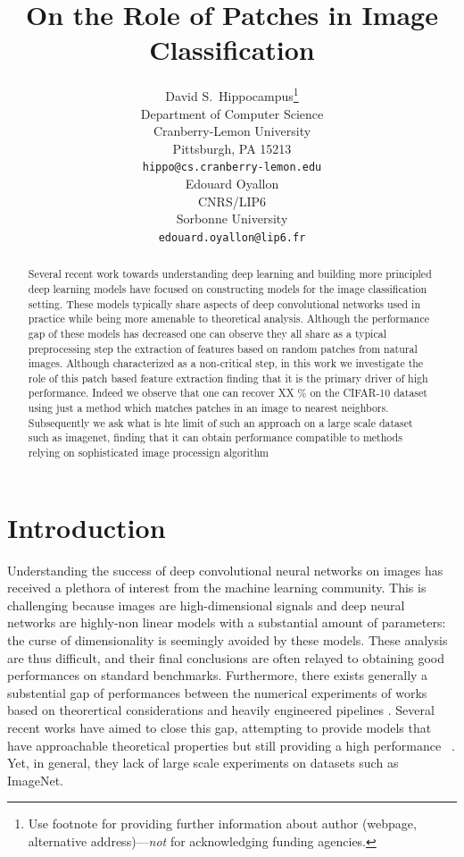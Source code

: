 \documentclass{article}
\title{On the Role of Patches in \Edouard{ Analysis of}  Image Classification \Edouard{models}}
\author{%
  David S.~Hippocampus\thanks{Use footnote for providing further information
    about author (webpage, alternative address)---\emph{not} for acknowledging
    funding agencies.} \\
  Department of Computer Science\\
  Cranberry-Lemon University\\
  Pittsburgh, PA 15213 \\
  \texttt{hippo@cs.cranberry-lemon.edu} \\
  \And
  Edouard Oyallon \\
  CNRS/LIP6 \\
  Sorbonne University \\
  \texttt{edouard.oyallon@lip6.fr} \\
}
\begin{document}
\maketitle

\begin{abstract}
  Several recent work towards understanding deep learning and building more principled deep learning models have focused on constructing models for the image classification setting. These models typically share aspects of deep convolutional networks used in practice while being more amenable to theoretical analysis. Although the performance gap of these models has decreased one can observe they all share as a typical preprocessing step the extraction of features based on random patches from natural images. Although characterized as a non-critical step, in this work we investigate the role of this patch based feature extraction finding that it is the primary driver of high performance. Indeed we observe that one can recover XX \% on the CIFAR-10 dataset using just a method which matches patches in an image to nearest neighbors. Subsequently we ask what is hte limit of such an approach on a large scale dataset such as imagenet, finding that it can obtain performance compatible to methods relying on sophisticated image processign algorithm
 
\end{abstract}

\section{Introduction}
Understanding the success of deep convolutional neural networks on images has received a plethora of interest from the machine learning community. 
This is challenging because images are high-dimensional signals and deep neural networks are highly-non linear models  with a substantial amount of parameters: the curse of dimensionality is seemingly avoided by these models. These analysis are thus difficult, and  their final conclusions are often relayed to obtaining  good  performances on standard benchmarks. Furthermore, there  exists generally a substential gap  of performances between the numerical experiments of works based on theorertical considerations and heavily engineered pipelines \citep{krizhevsky2012imagenet}. Several recent works have aimed to close this gap, attempting to provide models that have approachable theoretical properties but still providing a high performance
~\citep{li2019enhanced,shankar2020neural}. Yet, in general, they lack of large scale experiments on datasets such as ImageNet.
\end{document}
